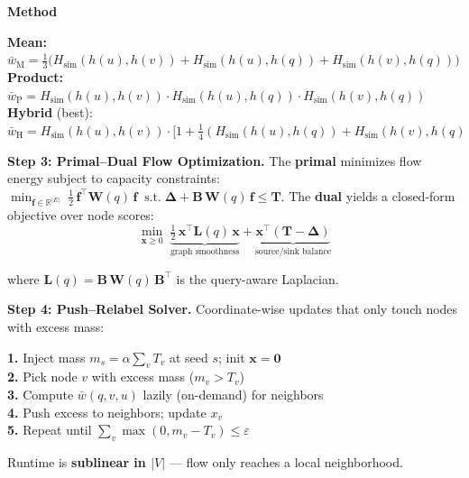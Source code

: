 \documentclass[final]{beamer}
\newlength{\colA}\setlength{\colA}{0.31\paperwidth}   %
\newcommand{\Hsim}{H_{\mathrm{sim}}}
\newcommand{\bx}{\mathbf{x}}
\begin{document}
\begin{frame}[t]
\begin{columns}[t]
\begin{column}{\colA}
\begin{block}{\Large\textbf{\color{samsungblue} Method}}
\vspace{0.2em}
\begin{tcolorbox}[colback=samsunglight, colframe=samsungblue, boxrule=1.5pt, arc=3pt, top=3pt, bottom=3pt]
  \textbf{Mean:}\; $\bar{w}_{\mathrm{M}} = \tfrac{1}{3}\bigl(\Hsim(h(u),h(v)) + \Hsim(h(u),h(q)) + \Hsim(h(v),h(q))\bigr)$\\[3pt]
  \textbf{Product:}\; $\bar{w}_{\mathrm{P}} = \Hsim(h(u),h(v)) \cdot \Hsim(h(u),h(q)) \cdot \Hsim(h(v),h(q))$\\[3pt]
  \textbf{Hybrid} (best):\; $\bar{w}_{\mathrm{H}} = \Hsim(h(u),h(v)) \cdot \bigl[1 + \tfrac{1}{4}(\Hsim(h(u),h(q)) + \Hsim(h(v),h(q)))\bigr]$
\end{tcolorbox}

\vspace{0.3em}
\textbf{Step 3: Primal--Dual Flow Optimization.}\;
The \textbf{primal} minimizes flow energy subject to capacity constraints:
$\min_{\mathbf{f}\in\mathbb{R}^{|E|}}\; \tfrac{1}{2}\,\mathbf{f}^\top \mathbf{W}(q)\,\mathbf{f} \;\; \text{s.t.}\; \boldsymbol{\Delta} + \mathbf{B}\,\mathbf{W}(q)\,\mathbf{f} \leq \mathbf{T}$.
The \textbf{dual} yields a closed-form objective over node scores:
$$\min_{\bx \geq 0}\; \underbrace{\tfrac{1}{2}\,\bx^\top \mathbf{L}(q)\,\bx}_{\text{graph smoothness}} + \underbrace{\bx^\top(\mathbf{T} - \boldsymbol{\Delta})}_{\text{source/sink balance}}$$

\vspace{-0.3em}
where $\mathbf{L}(q) = \mathbf{B}\,\mathbf{W}(q)\,\mathbf{B}^\top$ is the query-aware Laplacian.

\vspace{0.3em}
\textbf{Step 4: Push--Relabel Solver.}\;
Coordinate-wise updates that only touch nodes with excess mass:

\vspace{0.2em}
\colorbox{samsunglight}{\parbox{0.95\linewidth}{%
  \textbf{1.} Inject mass $m_s = \alpha \sum_v T_v$ at seed $s$; init $\bx = \mathbf{0}$\\[2pt]
  \textbf{2.} Pick node $v$ with excess mass ($m_v > T_v$)\\[2pt]
  \textbf{3.} Compute $\bar{w}(q,v,u)$ lazily (on-demand) for neighbors\\[2pt]
  \textbf{4.} Push excess to neighbors; update $x_v$\\[2pt]
  \textbf{5.} Repeat until $\sum_v \max(0, m_v - T_v) \leq \varepsilon$
}}

\vspace{0.2em}
Runtime is \textbf{sublinear in $|V|$} --- flow only reaches a local neighborhood.


\end{block}
\end{column}
\end{columns}
\end{frame}
\end{document}
